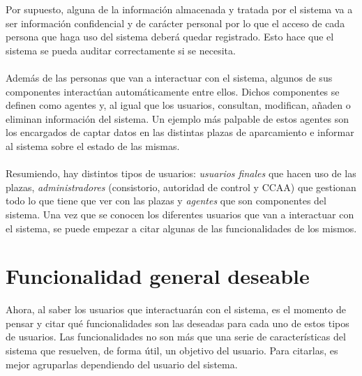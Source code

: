 Por supuesto, alguna de la información almacenada y tratada por el sistema va a ser información confidencial y de carácter personal por lo que el acceso de cada persona que haga uso del sistema deberá quedar registrado. Esto hace que el sistema se pueda auditar correctamente si se necesita.
\\\\
Además de las personas que van a interactuar con el sistema, algunos de sus componentes interactúan automáticamente entre ellos. Dichos componentes se definen como agentes y, al igual que los usuarios, consultan, modifican, añaden o eliminan información del sistema. Un ejemplo más palpable de estos agentes son los encargados de captar datos en las distintas plazas de aparcamiento e informar al sistema sobre el estado de las mismas.
\\\\
Resumiendo, hay distintos tipos de usuarios: \textit{usuarios finales} que hacen uso de las plazas, \textit{administradores} (consistorio, autoridad de control y CCAA) que gestionan todo lo que tiene que ver con las plazas y \textit{agentes} que son componentes del sistema. Una vez que se conocen los diferentes usuarios que van a interactuar con el sistema, se puede empezar a citar algunas de las funcionalidades de los mismos. 
\section{Funcionalidad general deseable}
Ahora, al saber los usuarios que interactuarán con el sistema, es el momento de pensar y citar qué funcionalidades son las deseadas para cada uno de estos tipos de usuarios. Las funcionalidades no son más que una serie de características del sistema que resuelven, de forma útil, un objetivo del usuario. Para citarlas, es mejor agruparlas dependiendo del usuario del sistema.
